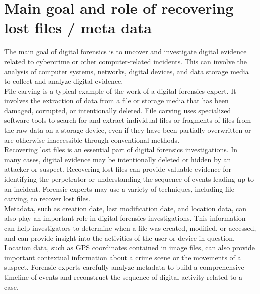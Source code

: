 \documentclass{scrreprt}
\begin{document}
\section{Main goal and role of recovering lost files / meta data}
The main goal of digital forensics is to uncover and investigate digital evidence related to cybercrime or other computer-related incidents. This can involve the analysis of computer systems, networks, digital devices, and data storage media to collect and analyze digital evidence.
\\\linebreak File carving is a typical example of the work of a digital forensics expert. It involves the extraction of data from a file or storage media that has been damaged, corrupted, or intentionally deleted. File carving uses specialized software tools to search for and extract individual files or fragments of files from the raw data on a storage device, even if they have been partially overwritten or are otherwise inaccessible through conventional methods.
\\\linebreak Recovering lost files is an essential part of digital forensics investigations. In many cases, digital evidence may be intentionally deleted or hidden by an attacker or suspect. Recovering lost files can provide valuable evidence for identifying the perpetrator or understanding the sequence of events leading up to an incident. Forensic experts may use a variety of techniques, including file carving, to recover lost files.
\\\linebreak Metadata, such as creation date, last modification date, and location data, can also play an important role in digital forensics investigations. This information can help investigators to determine when a file was created, modified, or accessed, and can provide insight into the activities of the user or device in question. Location data, such as GPS coordinates contained in image files, can also provide important contextual information about a crime scene or the movements of a suspect. Forensic experts carefully analyze metadata to build a comprehensive timeline of events and reconstruct the sequence of digital activity related to a case.
\end{document}
